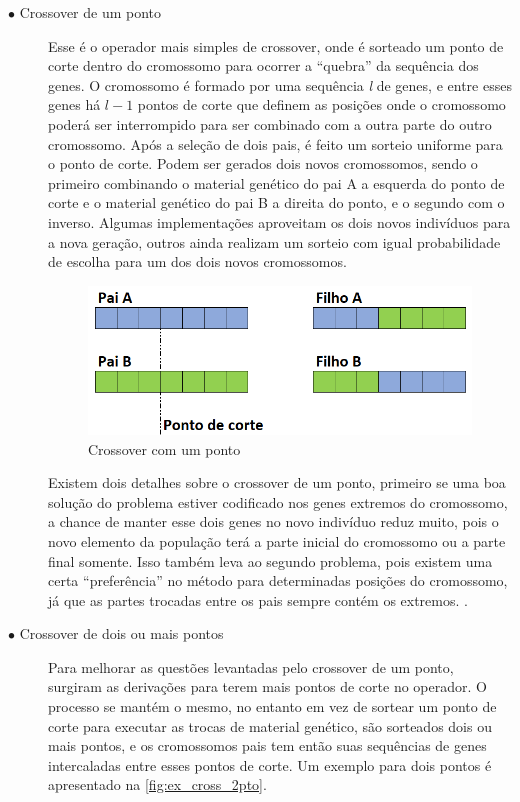 \begin{description}
\item[$\bullet$ Crossover de um ponto] \text{}

Esse é o operador mais simples de crossover, onde é sorteado um ponto de corte dentro do cromossomo para ocorrer a ``quebra'' da sequência dos genes. O cromossomo é formado por uma sequência \textit{l} de genes, e entre esses genes há \(l-1\) pontos de corte que definem as posições onde o cromossomo poderá ser interrompido para ser combinado com a outra parte do outro cromossomo. Após a seleção de dois pais, é feito um sorteio uniforme para o ponto de corte. Podem ser gerados dois novos cromossomos, sendo o primeiro combinando o material genético do pai A a esquerda do ponto de corte e o material genético do pai B a direita do ponto, e o segundo com o inverso. Algumas implementações aproveitam os dois novos indivíduos para a nova geração, outros ainda realizam um sorteio com igual probabilidade de escolha para um dos dois novos cromossomos.

\begin{figure}[ht]
	\centering
	\includegraphics[width=0.75\linewidth]{imagens/exemplo_cross_1pto.png}
	\caption{Crossover com um ponto}
	\label{fig:ex_cross_1pto}
\end{figure}

Existem dois detalhes sobre o crossover de um ponto, primeiro se uma boa solução do problema estiver codificado nos genes extremos do cromossomo, a chance de manter esse dois genes no novo indivíduo reduz muito, pois o novo elemento da população terá a parte inicial do cromossomo ou a parte final somente. Isso também leva ao segundo problema, pois existem uma certa ``preferência'' no método para determinadas posições do cromossomo, já que as partes trocadas entre os pais sempre contém os extremos. \cite{Mitchell1996}.

\item[$\bullet$ Crossover de dois ou mais pontos] \text{}

Para melhorar as questões levantadas pelo crossover de um ponto, surgiram as derivações para terem mais pontos de corte no operador. O processo se mantém o mesmo, no entanto em vez de sortear um ponto de corte para executar as trocas de material genético, são sorteados dois ou mais pontos, e os cromossomos pais tem então suas sequências de genes intercaladas entre esses pontos de corte. Um exemplo para dois pontos é apresentado na \autoref{fig:ex_cross_2pto}.


\end{description}
